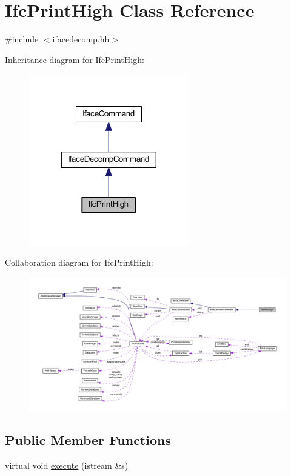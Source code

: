 \hypertarget{class_ifc_print_high}{}\section{Ifc\+Print\+High Class Reference}
\label{class_ifc_print_high}


{\ttfamily \#include $<$ifacedecomp.\+hh$>$}



Inheritance diagram for Ifc\+Print\+High\+:
\nopagebreak
\begin{figure}[H]
\begin{center}
\leavevmode
\includegraphics[width=197pt]{class_ifc_print_high__inherit__graph}
\end{center}
\end{figure}


Collaboration diagram for Ifc\+Print\+High\+:
\nopagebreak
\begin{figure}[H]
\begin{center}
\leavevmode
\includegraphics[width=350pt]{class_ifc_print_high__coll__graph}
\end{center}
\end{figure}
\subsection*{Public Member Functions}
\begin{DoxyCompactItemize}
\item 
virtual void \mbox{\hyperlink{class_ifc_print_high_a1ab0611a565a7dd33a40da7950e0ef17}{execute}} (istream \&s)
\end{DoxyCompactItemize}
